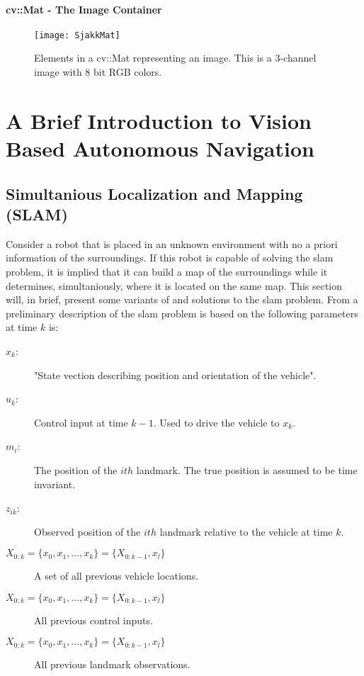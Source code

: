 \paragraph{cv::Mat - The Image Container}

\begin{figure}
\centering
\texttt{[image: SjakkMat]}
\caption{Elements in a cv::Mat representing an image. This is a 3-channel image with 8 bit RGB colors.}
\label{fig:matGrid}
\end{figure}

\section{A Brief Introduction to Vision Based Autonomous Navigation}

\subsection{Simultanious Localization and Mapping (SLAM)}

Consider a robot that is placed in an unknown environment with no a priori information of the surroundings. If this robot is capable of solving the \gls{slam} problem, it is implied that it can build a map of the surroundings while it determines, simultaniously, where it is located on the same map. This section will, in brief, present some variants of and solutions to the \gls{slam} problem. From \cite{SLAMp1} a preliminary description of the \gls{slam} problem is based on the following parameters at time $k$ is:
\vspace{-10pt} %
\begin{description}
	\item[\boldmath$x_k$:] "State vection describing position and orientation of the vehicle"\cite{SLAMp1}.
	\item[\boldmath$u_k$:] Control input at time $k - 1$. Used to drive the vehicle to $x_k$. 
	\item[\boldmath$m_i$:] The position of the $ith$ landmark. The true position is assumed to be time invariant.
	\item[\boldmath$z_{ik}$:] Observed position of the $ith$ landmark relative to the vehicle at time $k$.
	\item[\boldmath$X_{0:k} = \{ x_0, x_1, ... , x_k\} = \{ X_{0:k-1}, x_l \}$] A set of all previous vehicle locations. 
	\item[\boldmath$X_{0:k} = \{ x_0, x_1, ... , x_k\} = \{ X_{0:k-1}, x_l \}$] All previous control inputs.
	\item[\boldmath$X_{0:k} = \{ x_0, x_1, ... , x_k\} = \{ X_{0:k-1}, x_l \}$] All previous landmark observations.
\end{description}

